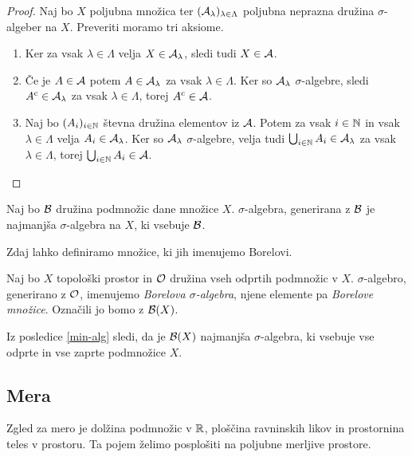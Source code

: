 \begin{proof}
    Naj bo \(X\) poljubna množica ter \((\mathcal{A}_\lambda)_{\lambda \in \Lambda}\) poljubna neprazna družina \(\sigma\)-algeber na \(X\).   
    Preveriti moramo tri aksiome.
    \begin{enumerate}
        \item Ker za vsak \(\lambda \in \Lambda\) velja \(X \in \mathcal{A}_\lambda\), sledi tudi \(X \in \mathcal{A}\).
        \item Če je \(A \in \mathcal{A}\) potem \(A \in \mathcal{A}_\lambda\) za vsak \(\lambda \in \Lambda\). Ker so \(\mathcal{A}_\lambda\) \(\sigma\)-algebre, sledi \(A^{\text{c}} \in \mathcal{A}_\lambda\) za vsak \(\lambda \in \Lambda\), torej  \(A^{\text{c}} \in \mathcal{A}\).
        \item Naj bo \((A_i)_{i \in \mathbb{N}}\) števna družina elementov iz \(\mathcal{A}\). Potem za vsak \(i \in \mathbb{N}\) in vsak \(\lambda \in \Lambda\) velja \(A_i \in \mathcal{A_\lambda}\). Ker so \(\mathcal{A}_\lambda\) \(\sigma\)-algebre, velja tudi \(\bigcup_{i \in \mathbb{N}} A_i \in \mathcal{A}_\lambda\) za vsak \(\lambda \in \Lambda\), torej \(\bigcup_{i \in \mathbb{N}} A_i \in \mathcal{A}\).
        \qedhere
    \end{enumerate}
\end{proof}

\begin{posledica}
    \label{min-alg}
    Naj bo \(\mathcal{B}\) družina podmnožic dane množice \(X\). \(\sigma\)-algebra, generirana z \(\mathcal{B}\) je najmanjša \(\sigma\)-algebra na \(X\), ki vsebuje \(\mathcal{B}\).
\end{posledica}

Zdaj lahko definiramo množice, ki jih imenujemo Borelovi.

\begin{definicija}
    Naj bo \(X\) topološki prostor in \(\mathcal{O}\) družina vseh odprtih podmnožic v \(X\). \(\sigma\)-algebro, generirano z \(\mathcal{O}\), imenujemo \emph{Borelova \(\sigma\)-algebra}, njene elemente pa \emph{Borelove množice}. Označili jo bomo z \(\mathcal{B}(X)\).
\end{definicija}

\begin{opomba}
    Iz posledice \ref{min-alg} sledi, da je \(\mathcal{B}(X)\) najmanjša \(\sigma\)-algebra, ki vsebuje vse odprte in vse zaprte podmnožice \(X\).
\end{opomba}

\subsection{Mera}
Zgled za mero je dolžina podmnožic v \(\mathbb{R}\), ploščina ravninskih likov in prostornina teles v prostoru. Ta pojem želimo posplošiti na poljubne merljive prostore.

